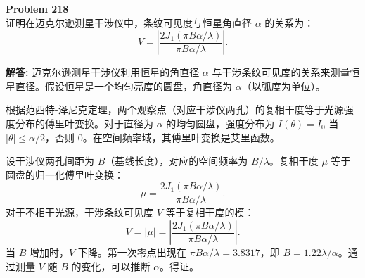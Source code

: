 \documentclass[12pt, a4paper, oneside]{ctexart}
\newenvironment{solution}{\par\noindent\textbf{解答:}\quad}{\par}
\begin{document}
\begin{mdframed}[backgroundcolor=gray!10, linewidth=0pt]
    \textbf{Problem 218} \\
    证明在迈克尔逊测星干涉仪中，条纹可见度与恒星角直径 $\alpha$ 的关系为：
    \[
    V = \left| \frac{2 J_1(\pi B \alpha / \lambda)}{\pi B \alpha / \lambda} \right|.
    \]
\end{mdframed}
\begin{solution}
    迈克尔逊测星干涉仪利用恒星的角直径 $\alpha$ 与干涉条纹可见度的关系来测量恒星直径。假设恒星是一个均匀亮度的圆盘，角直径为 $\alpha$（以弧度为单位）。

    根据范西特-泽尼克定理，两个观察点（对应干涉仪两孔）的复相干度等于光源强度分布的傅里叶变换。对于直径为 $\alpha$ 的均匀圆盘，强度分布为 $I(\theta) = I_0$ 当 $|\theta| \le \alpha/2$，否则 $0$。在空间频率域，其傅里叶变换是艾里函数。

    设干涉仪两孔间距为 $B$（基线长度），对应的空间频率为 $B/\lambda$。复相干度 $\mu$ 等于圆盘的归一化傅里叶变换：
    \[
    \mu = \frac{2 J_1(\pi B \alpha / \lambda)}{\pi B \alpha / \lambda}.
    \]
    对于不相干光源，干涉条纹可见度 $V$ 等于复相干度的模：
    \[
    V = |\mu| = \left| \frac{2 J_1(\pi B \alpha / \lambda)}{\pi B \alpha / \lambda} \right|.
    \]
    当 $B$ 增加时，$V$ 下降。第一次零点出现在 $\pi B \alpha / \lambda = 3.8317$，即 $B = 1.22 \lambda / \alpha$。通过测量 $V$ 随 $B$ 的变化，可以推断 $\alpha$。得证。
\end{solution}
\end{document}
